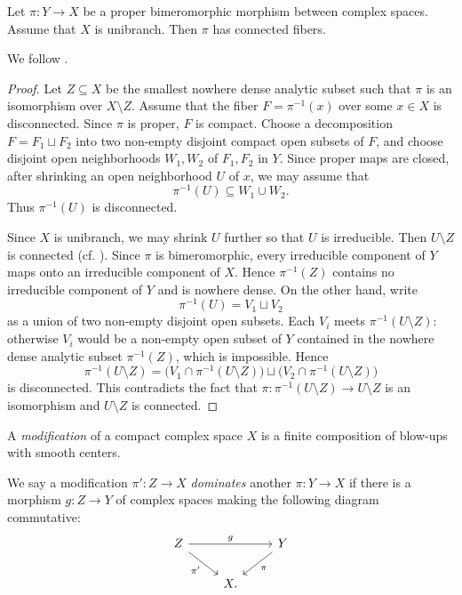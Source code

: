 \begin{theorem}\label{thm:Zariskimain}
    Let $\pi\colon Y\rightarrow X$ be a proper bimeromorphic morphism between complex spaces. Assume that $X$ is unibranch. Then $\pi$ has connected fibers.
\end{theorem}
We follow \cite[Proof of Théorème~1.7]{Dem85}.
\begin{proof}
    Let $Z\subseteq X$ be the smallest nowhere dense analytic subset such that $\pi$ is an isomorphism over $X\setminus Z$.
    Assume that the fiber $F=\pi^{-1}(x)$ over some $x\in X$ is disconnected.
    Since $\pi$ is proper, $F$ is compact. Choose a decomposition $F=F_1\sqcup F_2$ into two non-empty disjoint compact open subsets of $F$, and choose disjoint open neighborhoods $W_1,W_2$ of $F_1,F_2$ in $Y$. Since proper maps are closed, after shrinking an open neighborhood $U$ of $x$, we may assume that
    \[
        \pi^{-1}(U)\subseteq W_1\cup W_2.
    \]
    Thus $\pi^{-1}(U)$ is disconnected.

    Since $X$ is unibranch, we may shrink $U$ further so that $U$ is irreducible. Then $U\setminus Z$ is connected (cf. \cite[Chapter~9, \S1.2]{CAS}). Since $\pi$ is bimeromorphic, every irreducible component of $Y$ maps onto an irreducible component of $X$. Hence $\pi^{-1}(Z)$ contains no irreducible component of $Y$ and is nowhere dense. On the other hand, write
    \[
        \pi^{-1}(U)=V_1\sqcup V_2
    \]
    as a union of two non-empty disjoint open subsets. Each $V_i$ meets
    $\pi^{-1}(U\setminus Z)$: otherwise $V_i$ would be a non-empty open subset of $Y$ contained in the nowhere dense analytic subset $\pi^{-1}(Z)$, which is impossible. Hence
    \[
        \pi^{-1}(U\setminus Z)
        =
        \bigl(V_1\cap \pi^{-1}(U\setminus Z)\bigr)
        \sqcup
        \bigl(V_2\cap \pi^{-1}(U\setminus Z)\bigr)
    \]
    is disconnected. This contradicts the fact that
    $\pi\colon \pi^{-1}(U\setminus Z)\rightarrow U\setminus Z$ is an isomorphism and $U\setminus Z$ is connected.
\end{proof}

\begin{definition}\label{def:modif}
    A \emph{modification} of a compact complex space $X$ is a finite composition of blow-ups with smooth centers.

    We say a modification $\pi'\colon Z\rightarrow X$ \emph{dominates} another $\pi\colon Y\rightarrow X$ if there is a morphism $g\colon Z\rightarrow Y$ of complex spaces making the following diagram commutative:
    \begin{equation}\label{eq:domi}
    \begin{tikzcd}
Z \arrow[rr,"g"] \arrow[rd, "\pi'"'] &   & Y \arrow[ld, "\pi"] \\
                                 & X. &
\end{tikzcd}
    \end{equation}
\end{definition}

